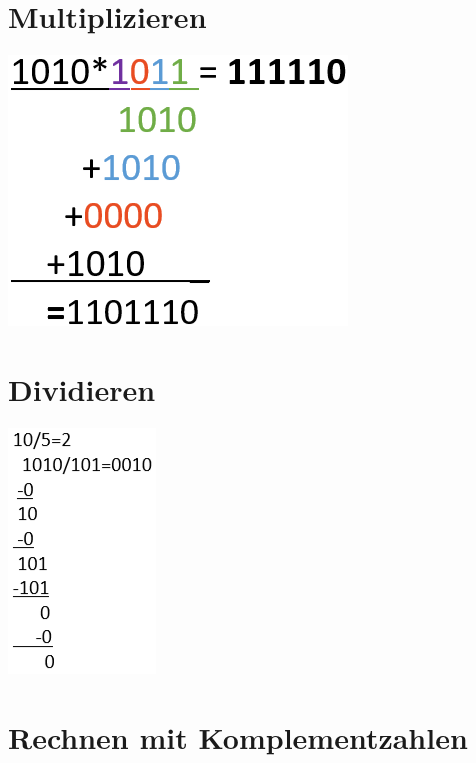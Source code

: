 \documentclass[12pt,a4paper]{article}
\begin{document}
\section{Multiplizieren}
	\includegraphics[scale=0.6]{Bilder/BinaryMultiply.png}
	
\section{Dividieren}
	\includegraphics[scale=1.1]{Bilder/BinaryDivision.PNG}
		
\section{Rechnen mit Komplementzahlen}
\end{document}
